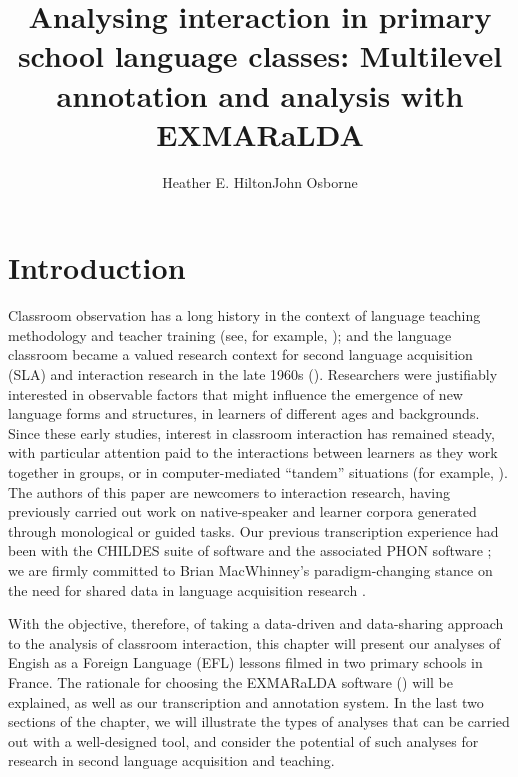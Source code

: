 \documentclass[output=paper,colorlinks,citecolor=brown,modfonts,nonflat]{../langscibook}
\author{Heather E. Hilton\affiliation{Université Lumière Lyon 2}\orcid{}\lastand John Osborne\affiliation{Université Savoie Mont Blanc}\orcid{}}
\title{Analysing interaction in primary school language classes: Multilevel annotation and analysis with EXMARaLDA}
\begin{document}
\maketitle 
{}





\section{Introduction~}

Classroom observation has a long history in the context of language teaching methodology and teacher training (see, for example, \citealt{Passy1885, Brebner1898}); and the language classroom became a valued research context for second language acquisition (SLA) and interaction research in the late 1960s (\citealt{Moskowitz1976, Jarvis1968, Wragg1970, SeligerLong1983, Allwright1984, Véronique1992}). Researchers were justifiably interested in observable factors that might influence the emergence of new language forms and structures, in learners of different ages and backgrounds. Since these early studies, interest in classroom interaction has remained steady, with particular attention paid to the interactions between learners as they work together in groups, or in computer-mediated “tandem” situations (for example, \citealt{DevelotteEtAl2008}). The authors of this paper are newcomers to interaction research, having previously carried out work on native-speaker and learner corpora generated through monological or guided tasks. Our previous transcription experience had been with the CHILDES suite of software \citep{MacWhinney2000} and the associated PHON software \citep{RoseEtAl2006}; we are firmly committed to Brian MacWhinney’s paradigm-changing stance on the need for shared data in language acquisition research \citep[27--30]{MacWhinney2010}.

With the objective, therefore, of taking a data-driven and data-sharing approach to the analysis of classroom interaction, this chapter will present our analyses of Engish as a Foreign Language  (EFL) lessons filmed in two primary schools in France. The rationale for choosing the EXMARaLDA software (\citealt{SchmidtWörner2014}) will be explained, as well as our transcription and annotation system. In the last two sections of the chapter, we will illustrate the types of analyses that can be carried out with a well-designed tool, and consider the potential of such analyses for research in second language acquisition and teaching.
\end{document}

